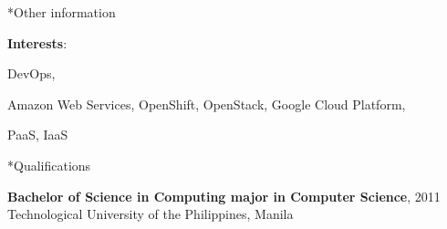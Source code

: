 \documentclass[10pt, a4paper, final]{article}
\begin{document}
\begin{section}*{Other information}
  \begin{inparadesc}
    \item \textbf{Interests}:
    \item DevOps,
    \item Amazon Web Services, OpenShift, OpenStack, Google Cloud Platform,
    \item PaaS, IaaS
  \end{inparadesc}
  \vspace{1em}
  \begin{subsection}*{Qualifications}
    \begin{compactitem}
      \vspace{0.25em}
      \item \textbf{Bachelor of Science in Computing major in Computer Science}, \textsc{2011}\\
      Technological University of the Philippines, Manila
      \vspace{0.25em}
      

\end{compactitem}
\end{subsection}
\end{section}
\end{document}
